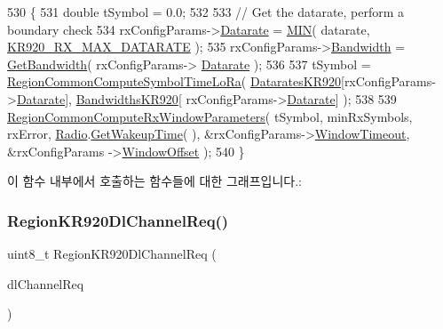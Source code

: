 \begin{DoxyCode}
530 \{
531     \textcolor{keywordtype}{double} tSymbol = 0.0;
532 
533     \textcolor{comment}{// Get the datarate, perform a boundary check}
534     rxConfigParams->\mbox{\hyperlink{structs_rx_config_params_ae2f6080f3aa0e9485c55513ca56bb24d}{Datarate}} = \mbox{\hyperlink{utilities_8h_a3acffbd305ee72dcd4593c0d8af64a4f}{MIN}}( datarate, \mbox{\hyperlink{group___r_e_g_i_o_n_k_r920_gae396329e09e498a769761010503fb797}{KR920\_RX\_MAX\_DATARATE}} );
535     rxConfigParams->\mbox{\hyperlink{structs_rx_config_params_aa8fc32e4883d30642e0ceb5845006a57}{Bandwidth}} = \mbox{\hyperlink{_region_k_r920_8c_afbe81e6d36760141722791d216d4ac60}{GetBandwidth}}( rxConfigParams->
      \mbox{\hyperlink{structs_rx_config_params_ae2f6080f3aa0e9485c55513ca56bb24d}{Datarate}} );
536 
537     tSymbol = \mbox{\hyperlink{group___r_e_g_i_o_n_c_o_m_m_o_n_ga79ed8b6555b68276d3c9ff2626b20fc8}{RegionCommonComputeSymbolTimeLoRa}}( 
      \mbox{\hyperlink{group___r_e_g_i_o_n_k_r920_gad80bddd73920e3855ac0568c7e3fdbff}{DataratesKR920}}[rxConfigParams->\mbox{\hyperlink{structs_rx_config_params_ae2f6080f3aa0e9485c55513ca56bb24d}{Datarate}}], \mbox{\hyperlink{group___r_e_g_i_o_n_k_r920_ga8f1abef3b467ea68edb452c7adcc8e08}{BandwidthsKR920}}[
      rxConfigParams->\mbox{\hyperlink{structs_rx_config_params_ae2f6080f3aa0e9485c55513ca56bb24d}{Datarate}}] );
538 
539     \mbox{\hyperlink{group___r_e_g_i_o_n_c_o_m_m_o_n_gaba7114d0ca01f04933710feb13646138}{RegionCommonComputeRxWindowParameters}}( tSymbol, minRxSymbols, 
      rxError, \mbox{\hyperlink{sx1276mb1las_8c_acf9fe61a72c16fa29a0dc449d23e3820}{Radio}}.\mbox{\hyperlink{struct_radio__s_aa6c05429af1a9f479d4720d95d0ee774}{GetWakeupTime}}( ), &rxConfigParams->\mbox{\hyperlink{structs_rx_config_params_a9d9f6c16ea62e2bcc09b100e2cb83e3f}{WindowTimeout}}, &rxConfigParams
      ->\mbox{\hyperlink{structs_rx_config_params_a9d092276960345e3b06ba105cf0c8b98}{WindowOffset}} );
540 \}
\end{DoxyCode}
이 함수 내부에서 호출하는 함수들에 대한 그래프입니다.\+:
\mbox{\label{group___r_e_g_i_o_n_k_r920_gaf071acd0ac6c6839c90ff7ee9192fbf6}} 
\subsubsection{\texorpdfstring{Region\+K\+R920\+Dl\+Channel\+Req()}{RegionKR920DlChannelReq()}}
{\footnotesize\ttfamily uint8\+\_\+t Region\+K\+R920\+Dl\+Channel\+Req (\begin{DoxyParamCaption}\item[{\mbox{\hyperlink{group___r_e_g_i_o_n_gae0d608ff1f8ea0a430e4f9a4c38ec7f3}{Dl\+Channel\+Req\+Params\+\_\+t}} $\ast$}]{dl\+Channel\+Req }\end{DoxyParamCaption})}



